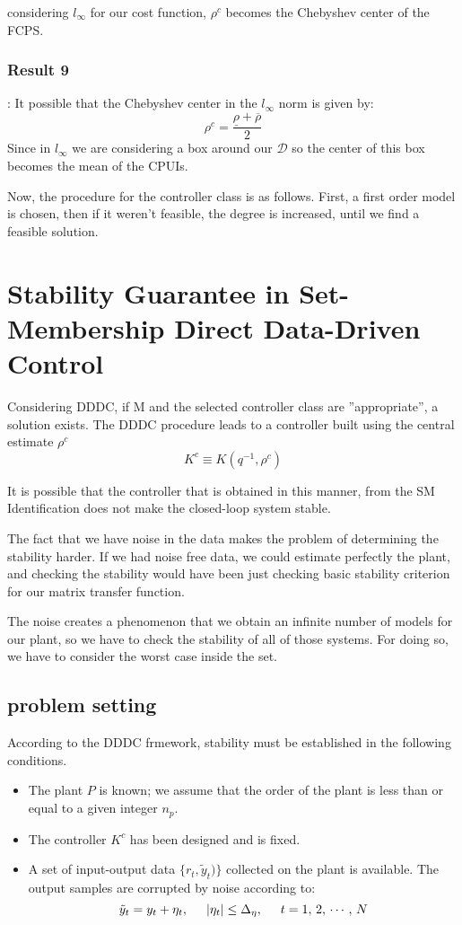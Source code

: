 considering $l_\infty$ for our cost function, $\rho^c$ becomes the Chebyshev center of the FCPS.

\subsubsection{Result 9}:
It possible that the Chebyshev center in the $l_\infty$ norm is given by:
\[
\rho^c = \frac{\underline{\rho}+\overline{\rho}}{2}
\]
Since in $l_\infty$ we are considering a box around our $\mathcal{D}$ so the center of this box becomes the mean of the CPUIs.

Now, the procedure for the controller class is as follows. First, a first order model is chosen, then if it weren't feasible, the degree is increased, until we find a feasible solution.


\section{Stability Guarantee in Set-Membership Direct Data-Driven Control}

Considering DDDC, if M and the selected controller class are ”appropriate”, a solution exists.
The DDDC procedure leads to a controller built using the central estimate $\rho^c$
\[
K^c \equiv K(q^{-1},\rho^c)
\]

It is possible that the controller that is obtained in this manner, from the SM Identification does not make the closed-loop system stable.

The fact that we have noise in the data makes the problem of determining the stability harder. If we had noise free data, we could estimate perfectly the plant, and checking the stability would have been just checking basic stability criterion for our matrix transfer function.

The noise creates a phenomenon that we obtain an infinite number of models for our plant, so we have to check the stability of all of those systems. For doing so, we have to consider the worst case inside the set.



\subsection{problem setting}

According to the DDDC frmework, stability must be established in the following conditions.
\begin{itemize}
    \item The plant $P$ is known; we assume that the order of the plant is less than or equal to a given integer $n_p$.
    \item The controller $K^c$ has been designed and is fixed.
    \item A set of input-output data $\{r_t,\tilde{y}_t)\}$ collected on the plant is available. The output samples are corrupted by noise according to:
    \[
    \tilde{y}_t = y_t + \eta_t, \hspace{0.5cm} |\eta_t|\leq \Delta_\eta, \hspace{0.5cm} t=1,\,2,\,\cdots,\,N
    \]
\end{itemize}

